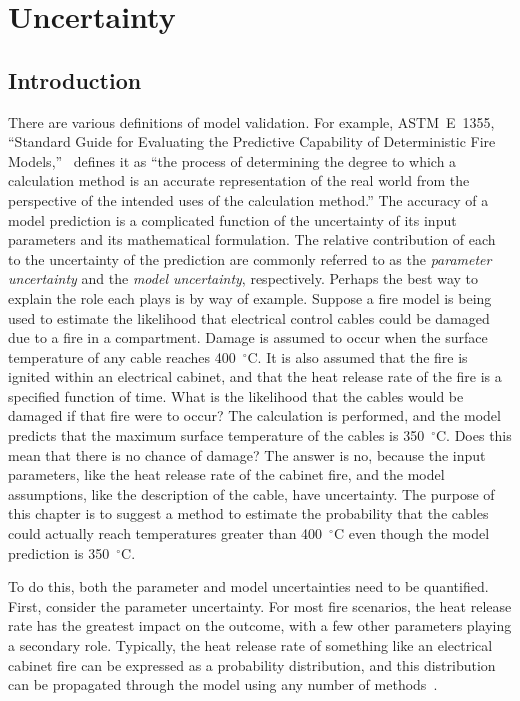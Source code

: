 
\newcommand{\paper}{chapter }

\chapter{Uncertainty}

\section{Introduction}

There are various definitions of model validation.
For example, ASTM~E~1355, ``Standard Guide for Evaluating the Predictive Capability of
Deterministic Fire Models,''~\cite{ASTM:E1355} defines it as ``the process of determining the degree to which a calculation method
is an accurate representation of the real world from the perspective of the intended uses of the calculation method.''
The accuracy of a model prediction is a complicated function of the uncertainty of its input parameters and its mathematical formulation.
The relative contribution of each to
the uncertainty of the prediction are commonly referred to as the {\em parameter uncertainty} and the
{\em model uncertainty}, respectively.
Perhaps the best way to explain the role each plays is by way of example.
Suppose a fire model is being used to estimate the likelihood that electrical control cables could be damaged due to
a fire in a compartment. Damage is assumed to occur when the surface temperature of any cable reaches 400~$^\circ$C. It is also assumed that the fire is
ignited within an electrical cabinet, and that the heat release rate of the fire is a specified function of time.
What is the likelihood that the cables would be damaged if that fire were to occur?
The calculation is performed, and the model predicts that the maximum surface temperature of the cables is 350~$^\circ$C.
Does this mean that there is no chance of damage? The answer is no, because the input parameters, like the heat release rate of
the cabinet fire, and the model assumptions, like the description of the cable, have uncertainty.
The purpose of this \paper is to suggest a method to estimate the probability that the cables could actually reach temperatures
greater than 400~$^\circ$C even though the model prediction is 350~$^\circ$C.

To do this, both the parameter and model uncertainties need to be quantified. First, consider the parameter uncertainty.
For most fire scenarios, the heat release rate has the greatest impact on the outcome, with a few other parameters playing a secondary role. Typically,
the heat release rate of something like an electrical cabinet fire can be expressed as a probability distribution, and this distribution can be propagated through the
model using any number of methods~\cite{SFPE:Notarianni}.

